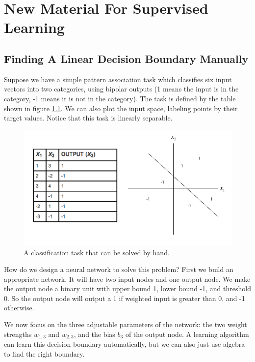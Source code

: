 \chapter{New Material For Supervised Learning}

\section{Finding A Linear Decision Boundary Manually}

Suppose we have a simple pattern association task which classifies six input vectors into two categories, using bipolar outputs (1 means the input is in the category, -1 means it is not in the category). The task is defined by the table shown in  figure \ref{simpleTask}.  We can also plot the input space, labeling points by their target values. Notice that this task is linearly separable. 

\begin{figure}[h]
\centering
\includegraphics[scale=.6]{./images/decisionBoundary.png}
\caption{A classification task that can be solved by hand.}
\label{simpleTask}
\end{figure}

How do we design a neural network to solve this problem? First we build an appropriate network. It will have two input nodes and one output node. We make the output node a binary unit with upper bound 1, lower bound -1, and threshold 0. So the output node will output a 1 if weighted input is greater than 0, and -1 otherwise.

We now focus on the three adjustable parameters of the network: the two weight strengths $w_{1,3}$ and $w_{2,3}$, and the bias $b_3$ of the output node. A learning algorithm can learn this decision boundary automatically, but we can also just use algebra to find the right boundary.

